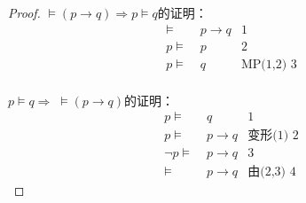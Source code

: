 \begin{proof}
    $\models (p\rightarrow q) \Rightarrow p\models q$的证明：
    \begin{align*}
        \models&\; p\rightarrow q  &\text{1}\\
        p\models&\; p &\text{2}\\
        p\models&\; q &\text{MP(1,2) 3}\\
    \end{align*}

    $p\models q \Rightarrow\; \models (p\rightarrow q) $的证明：
    \begin{align*}
        p\models&\; q &\text{1}\\
        p\models&\; p \rightarrow q &\text{变形(1) 2}\\
        \neg p\models&\; p \rightarrow q &\text{3}\\
        \models&\; p \rightarrow q &\text{由(2,3) 4}
    \end{align*}
\end{proof}